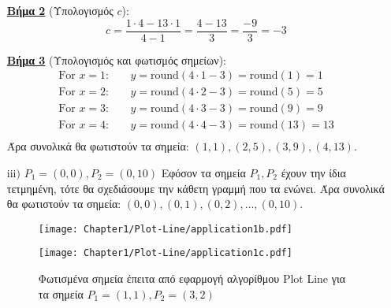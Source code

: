 \begin{application}
\begin{solution}
\begin{enumerate}
		\textbf{\underline{Βήμα 2}} (Υπολογισμός $c$):
		   \[
		   c = \frac{1 \cdot 4 - 13 \cdot 1}{4 - 1} = \frac{4 - 13}{3} = \frac{-9}{3} = -3
		   \]
		
		\textbf{\underline{Βήμα 3}} (Υπολογισμός και φωτισμός σημείων):	
		   \begin{align*}
		   \text{For } x = 1: & \quad y = \text{round}(4 \cdot 1 - 3) = \text{round}(1) = 1 \\
		   \text{For } x = 2: & \quad y = \text{round}(4 \cdot 2 - 3) = \text{round}(5) = 5 \\
		   \text{For } x = 3: & \quad y = \text{round}(4 \cdot 3 - 3) = \text{round}(9) = 9 \\
		   \text{For } x = 4: & \quad y = \text{round}(4 \cdot 4 - 3) = \text{round}(13) = 13 \\
		   \end{align*}
		Άρα συνολικά θα φωτιστούν τα σημεία: \( (1, 1), (2, 5), (3, 9), (4, 13) \).	
	
	\item[$\mathrm{iii)}$]  \( P_1 = (0, 0), P_2 = (0, 10) \) \newline 
		Εφόσον τα σημεία $P_1, P_2$ έχουν την ίδια τετμημένη, τότε θα σχεδιάσουμε την κάθετη γραμμή που τα ενώνει. 	
		Άρα συνολικά θα φωτιστούν τα σημεία: $ (0, 0), (0, 1), (0, 2), \ldots, (0, 10) $.
		
		\begin{figure}[h!]
			\begin{minipage}[b]{0.48\textwidth} %
				\begin{center}
				    \texttt{[image: Chapter1/Plot-Line/application1b.pdf]}
				\end{center}    
			\end{minipage}%
			\hfill
			\begin{minipage}[b]{0.48\textwidth} %
			    \begin{center}
				    \texttt{[image: Chapter1/Plot-Line/application1c.pdf]}
				\end{center}    
			\end{minipage}
			\caption{Φωτισμένα σημεία έπειτα από εφαρμογή αλγορίθμου Plot Line για τα σημεία $P_1 = (1,1), P_2 = (3,2)$}
		\end{figure}

\end{enumerate}


\end{solution}
	
\end{application}

